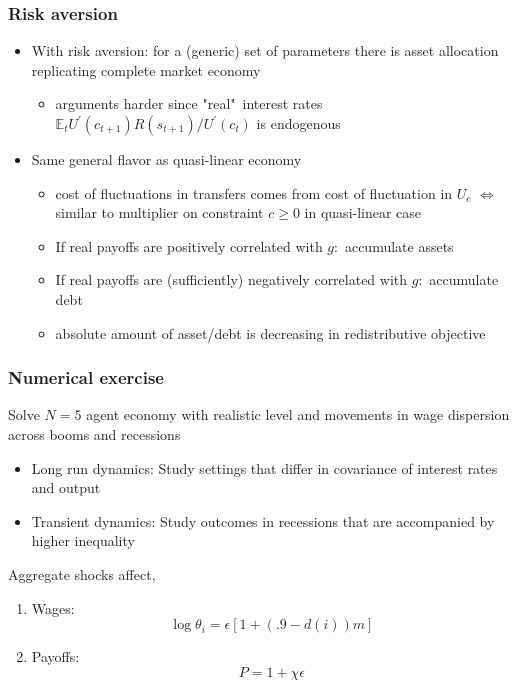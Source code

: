 \documentclass{beamer}
\begin{document}
\begin{frame}
\frametitle{Risk aversion}\label{risk aversion}

\begin{itemize}
\item With risk aversion: for a (generic) set of parameters there is asset allocation replicating complete market economy

\begin{itemize}
\item arguments harder since "real"\ interest rates $\mathbb{E}_{t}U^{\prime
}\left( c_{t+1}\right) R\left( s_{t+1}\right) /U^{\prime }\left(
c_{t}\right) $ is endogenous
\end{itemize}

\item Same general flavor as quasi-linear economy

\begin{itemize}
\item cost of fluctuations in transfers comes from cost of fluctuation in $%
U_{c}$ $\Longleftrightarrow $ similar to multiplier on constraint $c\geq 0$
in quasi-linear case

\item If real payoffs are positively correlated with $g:$ accumulate assets

\item If real payoffs are (sufficiently) negatively correlated with $g:$
accumulate debt

\item absolute amount of asset/debt is decreasing in redistributive objective
\end{itemize}
\end{itemize}
\hyperlink{risk aversion annex}{}
\end{frame}%


\begin{frame}
\frametitle{Numerical exercise}
 
Solve $N=5$ agent economy with realistic level and movements in wage dispersion across booms and recessions

\begin{itemize}
 \item Long run dynamics: Study settings that differ in covariance of interest rates and output
 \item Transient dynamics: Study outcomes in recessions that are accompanied by higher inequality
\end{itemize}

Aggregate shocks affect,
\begin{enumerate}
\item Wages: \[\log \theta_i=\epsilon [1+(.9-d(i))m]\]
 \item Payoffs: \[P=1+\chi \epsilon \]
\end{enumerate}

\end{frame}
\end{document}
